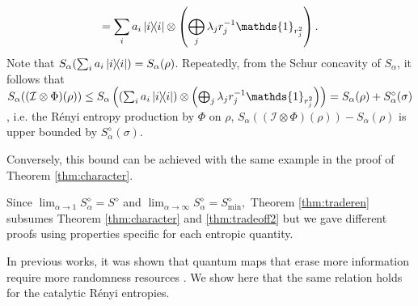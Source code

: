 \documentclass[aps, reprint, amsmath,amssymb, prx, superscriptaddress]{revtex4-2}
\begin{document}
\begin{proofEnd}
\begin{gather}
        = \sum_i a_i \dyad{i} \otimes \left(\bigoplus_j \lambda_jr_j^{-1}\mathds{1}_{r_j^2} \right).
    \end{gather}
    Note that $S_\alpha(\sum_i a_i\dyad{i}) = S_\alpha(\rho)$. Repeatedly, from the Schur concavity of $S_\alpha$, it follows that
    $S_\alpha((\mathcal{I}\otimes \Phi)(\rho))\leq S_\alpha \left(\left(\sum_i a_i \dyad{i} \right)\otimes \left(\bigoplus_j \lambda_j r_j^{-1}\mathds{1}_{r_j^2} \right) \right)=S_\alpha(\rho)+S_\alpha^\diamond(\sigma)$, i.e. the R\'{e}nyi entropy production by $\Phi$ on $\rho$, $S_\alpha((\mathcal{I}\otimes \Phi)(\rho)) -  S_\alpha (\rho)$ is upper bounded by $S_\alpha^\diamond(\sigma).$
    
    
    Conversely, this bound can be achieved with the same example in the proof of Theorem \ref{thm:character}.
\end{proofEnd}
Since $\lim_{\alpha \to 1}S_\alpha^\diamond=S^\diamond$ and $\lim_{\alpha \to \infty}S_\alpha^\diamond=S_{\min{}}^\diamond,$ Theorem \ref{thm:traderen} subsumes Theorem \ref{thm:character} and \ref{thm:tradeoff2} but we gave different proofs using properties specific for each entropic quantity.

In previous works, it was shown that quantum maps that erase more information require more randomness resources \cite{lie2020randomness,lie2020uniform}. We show here that the same relation holds for the catalytic R\'{e}nyi entropies.
\end{document}
